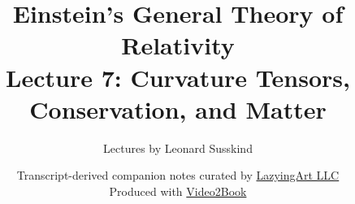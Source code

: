 \documentclass[11pt,oneside]{book}
\begin{document}
\frontmatter
\hypersetup{pageanchor=false}
\title{Einstein's General Theory of Relativity\\[0.45em]
\large Lecture 7: Curvature Tensors, Conservation, and Matter}
\author{Lectures by Leonard Susskind}
\date{Transcript-derived companion notes curated by
\href{https://lazying.art}{LazyingArt LLC}\\[0.35em]
\small Produced with
\href{https://github.com/lachlanchen/Video2Book}{Video2Book}}
\maketitle
\hypersetup{pageanchor=true}
\clearpage
\mainmatter

\end{document}
